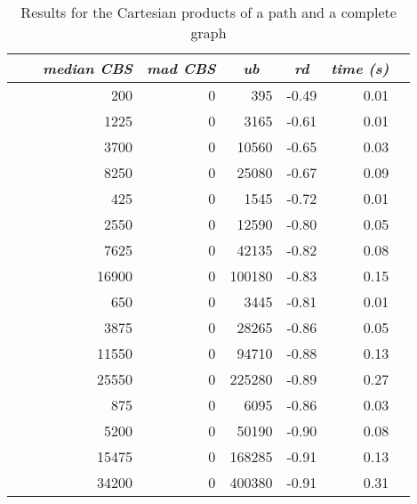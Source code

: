\documentclass{scrartcl}
\theoremstyle{plain}
\newcommand{\cbs}{CBS}
\begin{document}
\begin{table}[!ht]
	\centering
	\scriptsize
	\begin{tabular}{|ll|rr|r|r|r|r|} 
	\hline
	\multicolumn{1}{|c}{} &
	\multicolumn{1}{c|}{} &
	\multicolumn{1}{c}{\emph{median \cbs{}}} &
	\multicolumn{1}{c|}{\emph{mad \cbs{}}} &
	\multicolumn{1}{c|}{\emph{ub}} &
	\multicolumn{1}{c|}{\emph{rd}} &
	\multicolumn{1}{c|}{\emph{time (s)}} \\ \hline
		
	\makeatletter{} &  & 200 & 0 & 395 & -0.49 & 0.01 \\ 
 &  & 1225 & 0 & 3165 & -0.61 & 0.01 \\ 
 &  & 3700 & 0 & 10560 & -0.65 & 0.03 \\ 
 &  & 8250 & 0 & 25080 & -0.67 & 0.09 \\ 
 &  & 425 & 0 & 1545 & -0.72 & 0.01 \\ 
 &  & 2550 & 0 & 12590 & -0.80 & 0.05 \\ 
 &  & 7625 & 0 & 42135 & -0.82 & 0.08 \\ 
 &  & 16900 & 0 & 100180 & -0.83 & 0.15 \\ 
 &  & 650 & 0 & 3445 & -0.81 & 0.01 \\ 
 &  & 3875 & 0 & 28265 & -0.86 & 0.05 \\ 
 &  & 11550 & 0 & 94710 & -0.88 & 0.13 \\ 
 &  & 25550 & 0 & 225280 & -0.89 & 0.27 \\ 
 &  & 875 & 0 & 6095 & -0.86 & 0.03 \\ 
 &  & 5200 & 0 & 50190 & -0.90 & 0.08 \\ 
 &  & 15475 & 0 & 168285 & -0.91 & 0.13 \\ 
 &  & 34200 & 0 & 400380 & -0.91 & 0.31 \\ 
 
	
	\hline
	\end{tabular}
	\caption{\label{tab:cart_pk_perf}Results for the Cartesian products of a 
path and a complete graph}

\end{table}
\end{document}
